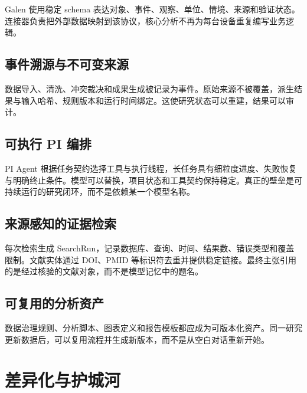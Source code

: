 \documentclass[11pt,a4paper,UTF8]{ctexart}
\begin{document}
Galen 使用稳定 schema 表达对象、事件、观察、单位、情境、来源和验证状态。连接器负责把外部数据映射到该协议，核心分析不再为每台设备重复编写业务逻辑。

\subsection{事件溯源与不可变来源}

数据导入、清洗、冲突裁决和成果生成被记录为事件。原始来源不被覆盖，派生结果与输入哈希、规则版本和运行时间绑定。这使研究状态可以重建，结果可以审计。

\subsection{可执行 PI 编排}

PI Agent 根据任务契约选择工具与执行线程，长任务具有细粒度进度、失败恢复与明确终止条件。模型可以替换，项目状态和工具契约保持稳定。真正的壁垒是可持续运行的研究闭环，而不是依赖某一个模型名称。

\subsection{来源感知的证据检索}

每次检索生成 SearchRun，记录数据库、查询、时间、结果数、错误类型和覆盖限制。文献实体通过 DOI、PMID 等标识符去重并提供稳定链接。最终主张引用的是经过核验的文献对象，而不是模型记忆中的题名。

\subsection{可复用的分析资产}

数据治理规则、分析脚本、图表定义和报告模板都应成为可版本化资产。同一研究更新数据后，可以复用流程并生成新版本，而不是从空白对话重新开始。

\section{差异化与护城河}
\end{document}

